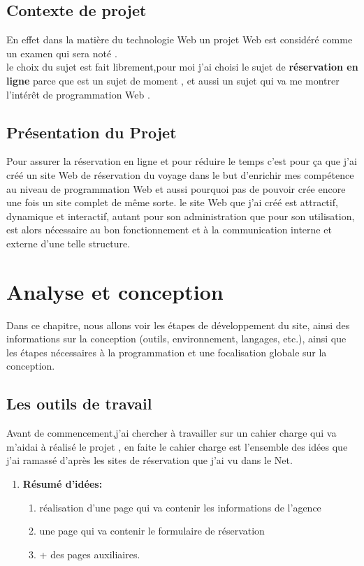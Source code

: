 \documentclass[a4paper,12pt]{report}
\begin{document}
\section{Contexte de projet}
\begin{tcolorbox}
En effet dans la matière du technologie Web un projet Web est considéré comme un examen qui sera noté .\\
le choix du sujet est fait librement,pour moi j'ai choisi le sujet de \textbf{réservation en ligne} parce que est un sujet de moment , et aussi un sujet qui va me montrer l'intérêt de programmation Web .
\end{tcolorbox}
\section{Présentation du Projet}
Pour assurer la réservation en ligne et pour réduire le temps c'est pour ça que j'ai créé un site Web de réservation du voyage dans le but
d'enrichir mes compétence au niveau de programmation Web et aussi pourquoi pas de pouvoir crée encore une fois un site complet de même sorte.
le site Web que j'ai créé est attractif, dynamique et interactif, autant pour son administration que pour son utilisation, est alors nécessaire au bon fonctionnement et à la communication interne et externe d’une telle structure.
\chapter{Analyse et conception}
Dans ce chapitre, nous allons voir les étapes de développement du site, ainsi des informations sur la conception (outils, environnement, langages, etc.), ainsi que les étapes nécessaires à la programmation et une focalisation globale sur la conception.
\section{Les outils de travail}
Avant de commencement,j'ai chercher à travailler sur un cahier charge qui va m'aidai à réalisé le projet , en faite le cahier charge est l'ensemble des idées que j'ai ramassé d'après les sites de réservation que j'ai vu dans le Net.
\begin{enumerate}
\item \textbf{Résumé d'idées:}
\begin{enumerate}
\item réalisation d'une page qui va contenir les informations de l'agence
\item une page qui va contenir le formulaire de réservation
\item + des pages auxiliaires.
\end{enumerate}
\end{enumerate}
\end{document}
